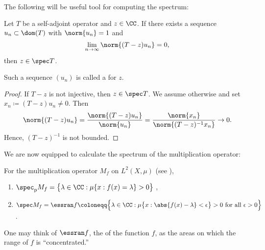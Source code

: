 \documentclass[oneside,reqno,letterpaper]{amsart}
\newcommand{\pspec}{\spec_{\mathrm{p}}}
\begin{document}
The following will be useful tool for computing the spectrum:

\begin{proposition}
\label{thm:weyl-sequence}
  Let \(T\) be a self-adjoint operator and \(z \in \CC\). 
  If there exists a sequence \({u_n} \subset \dom(T)\) with \(\norm{u_n} = 1\) and 
  \[
    \lim_{n \to \infty} \norm{(T - z) u_n} = 0 , 
  \] 
  then \(z \in \spec T\). 
\end{proposition}
Such a sequence \((u_n)\) is called a  for \(z\).
\begin{proof}
  If \(T - z\) is not injective, then \(z \in \spec T\).
  We assume otherwise and set \(x_n \coloneqq (T - z) u_n \neq 0\).
  Then
  \[
    \norm{(T - z) u_n} 
    = \frac{\norm{(T - z) u_n}}{\norm{u_n}} 
    = \frac{\norm{x_n}}{\norm{(T - z)^{-1} x_n}} \to 0 . 
  \] 
  Hence, \((T - z)^{-1}\) is not bounded. 
\end{proof}




We are now equipped to calculate the spectrum of the multiplication operator: 
\begin{proposition}
\label{thm:multiplication-operator-spectrum}
  For the multiplication operator \(M_f\) on \(L^2(X, \mu)\) (see ), 
  \begin{enumerate}[label=(\alph*)]
    \item  \(\pspec M_f = \big\{ \lambda \in \CC: \mu\{x: f(x) = \lambda\} > 0 \big\}\) ,  
    \item \(
      \spec M_f 
      = \essran f 
      \coloneqq \Big\{ 
        \lambda \in \CC: 
        \mu\big\{x:\abs{f(x) - \lambda} < \epsilon\big\} > 0 \text{ for all } \epsilon > 0
      \Big\}
      \). 
  \end{enumerate}
\end{proposition}
One may think of \(\essran f\), the  of the function \(f\), as the areas on which the range of \(f\) is ``concentrated.''
\end{document}
